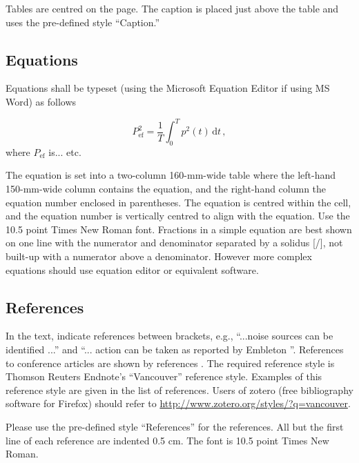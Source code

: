 Tables are centred on the page. The caption is placed just above the table and uses the pre-defined style ``Caption.''

\subsection{Equations}

Equations shall be typeset (using the Microsoft Equation Editor if using MS Word) as follows

\begin{equation}
P_{\text{ef}}^2=\frac{1}{T}\int_{0}^{T} p^2(t)\, \text{d} t \,,
\label{eq:equation1}
\end{equation}
%
where $P_{\text{ef}}$ is... etc.

The equation is set into a two-column 160-mm-wide table where the left-hand 150-mm-wide column contains the equation, and the right-hand column the equation number enclosed in parentheses. The equation is centred within the cell, and the equation number is vertically centred to align with the equation. Use the 10.5 point Times New Roman font. Fractions in a simple equation are best shown on one line with the numerator and denominator separated by a solidus [/], not built-up with a numerator above a denominator. However more complex equations should use equation editor or equivalent software.

\subsection{References}

In the text, indicate references between brackets, e.g., ``...noise sources can be identified \cite{ref1, Patricio2008}...'' and ``... action can be taken as reported by Embleton \cite{prec1}''. References to conference articles are shown by references \cite{Vechiatti2010,book1,Fonseca-2013,Beranek2004,CEN}. The required reference style is Thomson Reuters Endnote's ``Vancouver'' reference style. Examples of this reference style are given in the list of references. Users of zotero (free bibliography software for Firefox) should refer to \href{http://www.zotero.org/styles/?q=vancouver}{http://www.zotero.org/styles/?q=vancouver}.

Please use the pre-defined style ``References'' for the references. All but the first line of each reference are indented 0.5 cm. The font is 10.5 point Times New Roman.

